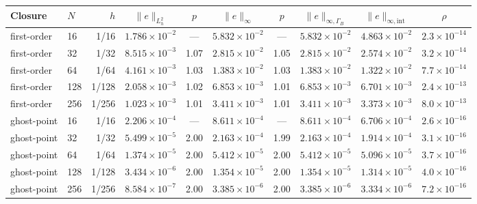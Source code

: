 \begin{tabular}{@{}llrccccccc@{}}\toprule
Closure & $N$ & $h$ & $\|e\|_{L^2_h}$ & $p$ & $\|e\|_{\infty}$ & $p$ & $\|e\|_{\infty,\Gamma_B}$ & $\|e\|_{\infty,\mathrm{int}}$ & $\rho$\\\midrule
first-order & 16 & 1/16 & $1.786\times10^{-2}$ & --- & $5.832\times10^{-2}$ & --- & $5.832\times10^{-2}$ & $4.863\times10^{-2}$ & $2.3\times10^{-14}$\\
first-order & 32 & 1/32 & $8.515\times10^{-3}$ & 1.07 & $2.815\times10^{-2}$ & 1.05 & $2.815\times10^{-2}$ & $2.574\times10^{-2}$ & $3.2\times10^{-14}$\\
first-order & 64 & 1/64 & $4.161\times10^{-3}$ & 1.03 & $1.383\times10^{-2}$ & 1.03 & $1.383\times10^{-2}$ & $1.322\times10^{-2}$ & $7.7\times10^{-14}$\\
first-order & 128 & 1/128 & $2.058\times10^{-3}$ & 1.02 & $6.853\times10^{-3}$ & 1.01 & $6.853\times10^{-3}$ & $6.701\times10^{-3}$ & $2.4\times10^{-13}$\\
first-order & 256 & 1/256 & $1.023\times10^{-3}$ & 1.01 & $3.411\times10^{-3}$ & 1.01 & $3.411\times10^{-3}$ & $3.373\times10^{-3}$ & $8.0\times10^{-13}$\\
\midrule
ghost-point & 16 & 1/16 & $2.206\times10^{-4}$ & --- & $8.611\times10^{-4}$ & --- & $8.611\times10^{-4}$ & $6.706\times10^{-4}$ & $2.6\times10^{-16}$\\
ghost-point & 32 & 1/32 & $5.499\times10^{-5}$ & 2.00 & $2.163\times10^{-4}$ & 1.99 & $2.163\times10^{-4}$ & $1.914\times10^{-4}$ & $3.1\times10^{-16}$\\
ghost-point & 64 & 1/64 & $1.374\times10^{-5}$ & 2.00 & $5.412\times10^{-5}$ & 2.00 & $5.412\times10^{-5}$ & $5.096\times10^{-5}$ & $3.7\times10^{-16}$\\
ghost-point & 128 & 1/128 & $3.434\times10^{-6}$ & 2.00 & $1.354\times10^{-5}$ & 2.00 & $1.354\times10^{-5}$ & $1.314\times10^{-5}$ & $4.0\times10^{-16}$\\
ghost-point & 256 & 1/256 & $8.584\times10^{-7}$ & 2.00 & $3.385\times10^{-6}$ & 2.00 & $3.385\times10^{-6}$ & $3.334\times10^{-6}$ & $7.2\times10^{-16}$\\
\bottomrule
\end{tabular}